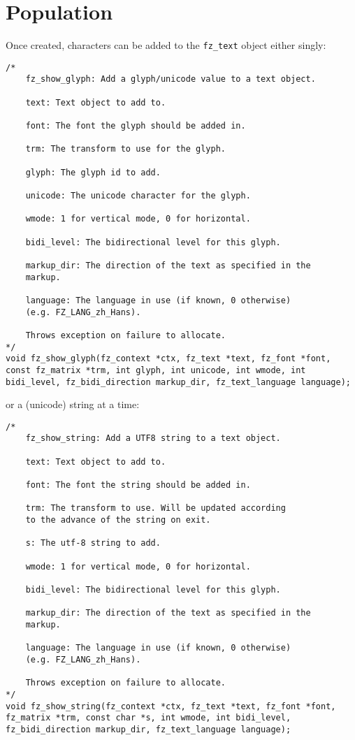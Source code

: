 \documentclass[oneside]{book}
\begin{document}
\section{Population}
\label{TextPopulation}

Once created, characters can be added to the \texttt{fz\_text} object either singly:

\begin{lstlisting}
/*
	fz_show_glyph: Add a glyph/unicode value to a text object.

	text: Text object to add to.

	font: The font the glyph should be added in.

	trm: The transform to use for the glyph.

	glyph: The glyph id to add.

	unicode: The unicode character for the glyph.

	wmode: 1 for vertical mode, 0 for horizontal.

	bidi_level: The bidirectional level for this glyph.

	markup_dir: The direction of the text as specified in the
	markup.

	language: The language in use (if known, 0 otherwise)
	(e.g. FZ_LANG_zh_Hans).

	Throws exception on failure to allocate.
*/
void fz_show_glyph(fz_context *ctx, fz_text *text, fz_font *font, const fz_matrix *trm, int glyph, int unicode, int wmode, int bidi_level, fz_bidi_direction markup_dir, fz_text_language language);
\end{lstlisting}

or a (unicode) string at a time:

\begin{lstlisting}
/*
	fz_show_string: Add a UTF8 string to a text object.

	text: Text object to add to.

	font: The font the string should be added in.

	trm: The transform to use. Will be updated according
	to the advance of the string on exit.

	s: The utf-8 string to add.

	wmode: 1 for vertical mode, 0 for horizontal.

	bidi_level: The bidirectional level for this glyph.

	markup_dir: The direction of the text as specified in the
	markup.

	language: The language in use (if known, 0 otherwise)
	(e.g. FZ_LANG_zh_Hans).

	Throws exception on failure to allocate.
*/
void fz_show_string(fz_context *ctx, fz_text *text, fz_font *font, fz_matrix *trm, const char *s, int wmode, int bidi_level, fz_bidi_direction markup_dir, fz_text_language language);
\end{lstlisting}
\end{document}
